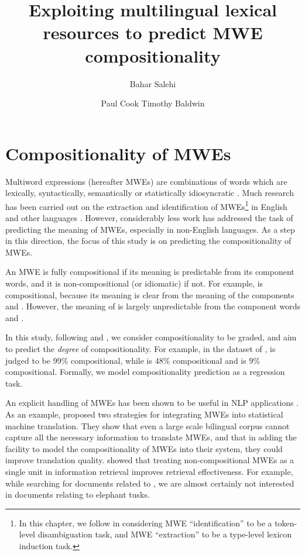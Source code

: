 \documentclass[output=paper
,modfonts
,nonflat]{langsci/langscibook}
\title{Exploiting multilingual lexical resources to predict MWE compositionality}
\author{
Bahar Salehi\affiliation{The University of Melbourne}\and 
Paul Cook\affiliation{University of New Brunswick} \lastand
Timothy Baldwin\affiliation{The University of Melbourne} }
\begin{document}
\maketitle
\label{SALEHI-CHAPTER}



\section{Compositionality of MWEs\label{salehi:sec:intro}}


Multiword expressions (hereafter MWEs) are combinations of words which
are lexically, syntactically, semantically or statistically
idiosyncratic \citep{Sag2002a,baldwin2010multiword}. Much research has
been carried out on the extraction and identification of
MWEs\footnote{In this chapter, we follow \citet{baldwin2010multiword} in
  considering MWE ``identification'' to be a token-level
  disambiguation task, and MWE ``extraction'' to be a type-level
  lexicon induction task.} in English
\citep{Schone2001,Pecina2008,fazly-cook-stevenson:2009:CL} and other languages
\citep{dias2003,evert2005,salehi2012}. However, considerably less work
has addressed the task of predicting the meaning of MWEs, especially
in non-English languages. As a step in this direction, the focus of
this study is on predicting the compositionality of MWEs.

An MWE is fully compositional if its meaning is predictable from its
component words, and it is non-compositional (or idiomatic) if
not. For example,   is
compositional, because its meaning is clear from the meaning of the
components  and . However, the meaning of
  is largely unpredictable
from the component words  and .

In this study, following \citet{mccarthy2003} and
\citet{reddy2011a}, we consider compositionality to be graded, and aim
to predict the \textit{degree} of compositionality. For example, in the
dataset of \citet{reddy2011a},  is judged to be
99\% compositional, while  is 48\% compositional and
 is 9\% compositional. Formally, we model
compositionality prediction as a regression task.

An explicit handling of MWEs has been shown to be useful in NLP
applications \citep{ramisch2012}. As an example, \citet{carpuat2010}
proposed two strategies for integrating MWEs into statistical machine
translation. They show that even a large scale bilingual corpus cannot
capture all the necessary information to translate MWEs, and that in
adding the facility to model the compositionality of MWEs into their
system, they could improve translation quality. \citet{acosta2011}
showed that treating non-compositional MWEs as a single unit in
information retrieval improves retrieval effectiveness. For example,
while searching for documents related to , we are
almost certainly not interested in documents relating to elephant
tusks.
\end{document}
